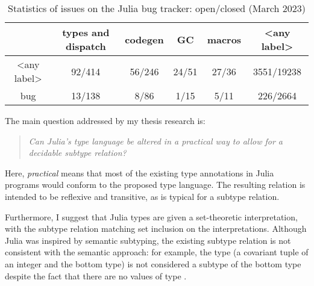 \begin{table}[t]
\caption{Statistics of issues on the Julia bug tracker: open/closed (March 2023)}\label{tab:julia-issues-stats}
\vspace*{0.25em}
\centering\footnotesize
\begin{tabular}{c|ccccc}
 & types and dispatch & codegen & GC & macros & <any label> \\
\midrule
<any label> &
  92/414 & 56/246 & 24/51 & 27/36 & 3551/19238 \\
bug &
  13/138 & 8/86 & 1/15 & 5/11 & 226/2664
\end{tabular}
\end{table}

The main question addressed by my thesis research is:
\begin{quote}
\emph{Can Julia's type language be altered in a practical way
to allow for a decidable subtype relation?}
\end{quote}
Here, \emph{practical} means that most of the existing type annotations
in Julia programs would conform to the proposed type language.
The resulting relation is intended to be reflexive and transitive, as is
typical for a subtype relation. 

Furthermore, I suggest that Julia types are given a set-theoretic interpretation,
with the subtype relation matching set inclusion on the interpretations.
Although Julia was inspired by semantic subtyping, the existing subtype relation
is not consistent with the semantic approach: for example, the type 
 (a covariant tuple of an integer and the bottom type)
is not considered a subtype of the bottom type despite the fact that there are
no values of type .



